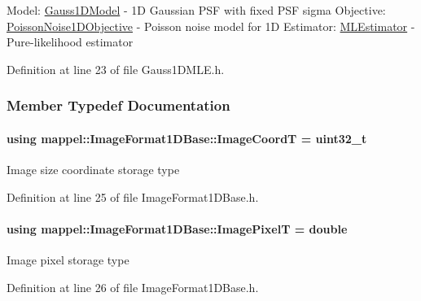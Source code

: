 Model\+: \hyperlink{classmappel_1_1Gauss1DModel}{Gauss1\+D\+Model} -\/ 1D Gaussian P\+SF with fixed P\+SF sigma Objective\+: \hyperlink{classmappel_1_1PoissonNoise1DObjective}{Poisson\+Noise1\+D\+Objective} -\/ Poisson noise model for 1D Estimator\+: \hyperlink{classmappel_1_1MLEstimator}{M\+L\+Estimator} -\/ Pure-\/likelihood estimator 

Definition at line 23 of file Gauss1\+D\+M\+L\+E.\+h.



\subsubsection{Member Typedef Documentation}
\paragraph[{\texorpdfstring{Image\+CoordT}{ImageCoordT}}]{\setlength{\rightskip}{0pt plus 5cm}using {\bf mappel\+::\+Image\+Format1\+D\+Base\+::\+Image\+CoordT} =  uint32\+\_\+t\hspace{0.3cm}{\ttfamily [inherited]}}\hypertarget{classmappel_1_1ImageFormat1DBase_a82ab3168eb1a87eaeb3e7c919188e9fc}{}\label{classmappel_1_1ImageFormat1DBase_a82ab3168eb1a87eaeb3e7c919188e9fc}
Image size coordinate storage type 

Definition at line 25 of file Image\+Format1\+D\+Base.\+h.

\paragraph[{\texorpdfstring{Image\+PixelT}{ImagePixelT}}]{\setlength{\rightskip}{0pt plus 5cm}using {\bf mappel\+::\+Image\+Format1\+D\+Base\+::\+Image\+PixelT} =  double\hspace{0.3cm}{\ttfamily [inherited]}}\hypertarget{classmappel_1_1ImageFormat1DBase_a156fe500fd249cb4b77bdb0abc0dd0ea}{}\label{classmappel_1_1ImageFormat1DBase_a156fe500fd249cb4b77bdb0abc0dd0ea}
Image pixel storage type 

Definition at line 26 of file Image\+Format1\+D\+Base.\+h.


